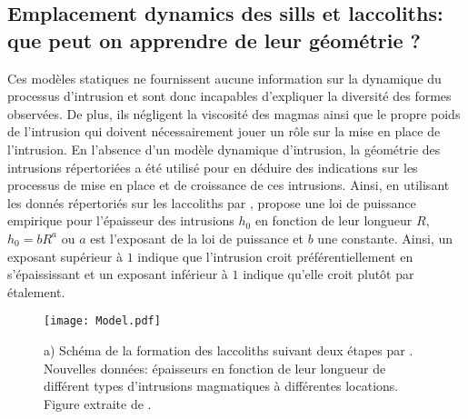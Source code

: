 \subsection{Emplacement dynamics des sills  et laccoliths: que peut on
  apprendre de leur géométrie ?}
\label{sec:empl-dynam-des}

Ces  modèles  statiques  ne  fournissent  aucune  information  sur  la
dynamique du processus d'intrusion et sont donc incapables d'expliquer
la diversité des formes observées. De plus, ils négligent la viscosité
des  magmas ainsi  que  le  propre poids  de  l'intrusion qui  doivent
nécessairement jouer un rôle sur la  mise en place de l'intrusion.  En
l'absence  d'un   modèle  dynamique  d'intrusion,  la   géométrie  des
intrusions répertoriées a été utilisé  pour en déduire des indications
sur les processus de mise en place et de croissance de ces intrusions.
Ainsi,  en utilisant  les donnés  répertoriés sur  les laccoliths  par
\citet{E:2015tl},   \citet{McCaffrey:1997ea}   propose  une   loi   de
puissance empirique pour l'épaisseur  des intrusions $h_0$ en fonction
de leur longueur $R$, $h_0 = bR^a$  ou $a$ est l'exposant de la loi de
puissance et  $b$ une  constante. Ainsi, un  exposant supérieur  à $1$
indique que l'intrusion croit  préférentiellement en s'épaississant et
un  exposant  inférieur  à  $1$   indique  qu'elle  croit  plutôt  par
étalement.

\begin{figure}
  \begin{center}
    \graphicspath{ {/Users/thorey/Documents/These/Manuscript/Figure/Chapter1/} }
    \texttt{[image: Model.pdf]}
    \caption{a)  Schéma de  la formation  des laccoliths  suivant deux
      étapes   par   \citet{McCaffrey:1997ea}.    Nouvelles   données:
      épaisseurs  en  fonction de  leur  longueur  de différent  types
      d'intrusions  magmatiques   à  différentes   locations.   Figure
      extraite de \citet{Cruden:tg}.}
    \label{Model}
  \end{center}
\end{figure}


